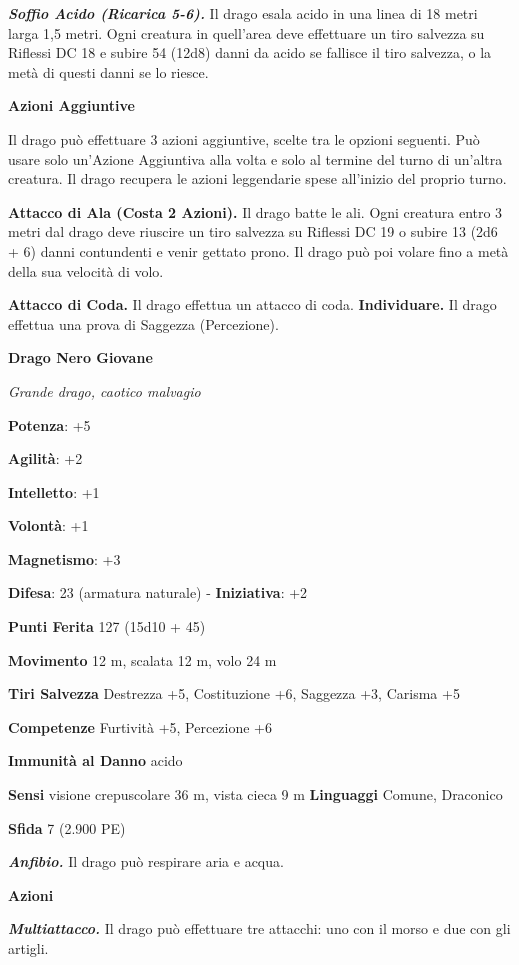 \begin{multicols}{2}
\emph{\textbf{Soffio Acido (Ricarica 5-6).}} Il drago esala acido in una
linea di 18 metri larga 1,5 metri. Ogni creatura in quell'area deve
effettuare un tiro salvezza su Riflessi DC 18 e subire 54 (12d8) danni
da acido se fallisce il tiro salvezza, o la metà di questi danni se lo
riesce.

\textbf{Azioni Aggiuntive}

Il drago può effettuare 3 azioni aggiuntive, scelte tra le opzioni
seguenti. Può usare solo un'Azione Aggiuntiva alla volta e solo al
termine del turno di un'altra creatura. Il drago recupera le azioni
leggendarie spese all'inizio del proprio turno.

\textbf{Attacco di Ala (Costa 2 Azioni).} Il drago batte le ali. Ogni
creatura entro 3 metri dal drago deve riuscire un tiro salvezza su Riflessi DC 19 o subire 13 (2d6 + 6) danni contundenti e venir gettato
prono. Il drago può poi volare fino a metà della sua velocità di volo.

\textbf{Attacco di Coda.} Il drago effettua un attacco di coda.
\textbf{Individuare.} Il drago effettua una prova di Saggezza
(Percezione).

\textbf{Drago Nero Giovane}

\emph{Grande drago, caotico malvagio}

\textbf{Potenza}: +5

\textbf{Agilità}: +2

\textbf{Intelletto}: +1

\textbf{Volontà}: +1

\textbf{Magnetismo}: +3

\textbf{Difesa}: 23 (armatura naturale) - \textbf{Iniziativa}: +2

\textbf{Punti Ferita} 127 (15d10 + 45)

\textbf{Movimento} 12 m, scalata 12 m, volo 24 m

\textbf{Tiri Salvezza} Destrezza +5, Costituzione +6, Saggezza +3,
Carisma +5

\textbf{Competenze} Furtività +5, Percezione +6

\textbf{Immunità al Danno} acido

\textbf{Sensi} visione crepuscolare 36 m, vista cieca 9 m
\textbf{Linguaggi} Comune, Draconico

\textbf{Sfida} 7 (2.900 PE)

\emph{\textbf{Anfibio.}} Il drago può respirare aria e acqua.

\textbf{Azioni}

\emph{\textbf{Multiattacco.}} Il drago può effettuare tre attacchi: uno
con il morso e due con gli artigli.


\end{multicols}
